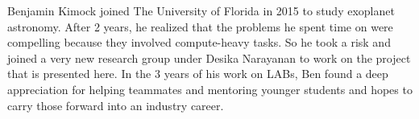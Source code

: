 Benjamin Kimock joined The University of Florida in 2015 to study exoplanet astronomy.
After 2 years, he realized that the problems he spent time on were compelling because they involved compute-heavy tasks.
So he took a risk and joined a very new research group under Desika Narayanan to work on the project that is presented here.
In the 3 years of his work on LABs, Ben found a deep appreciation for helping teammates and mentoring younger students and hopes to carry those forward into an industry career.
